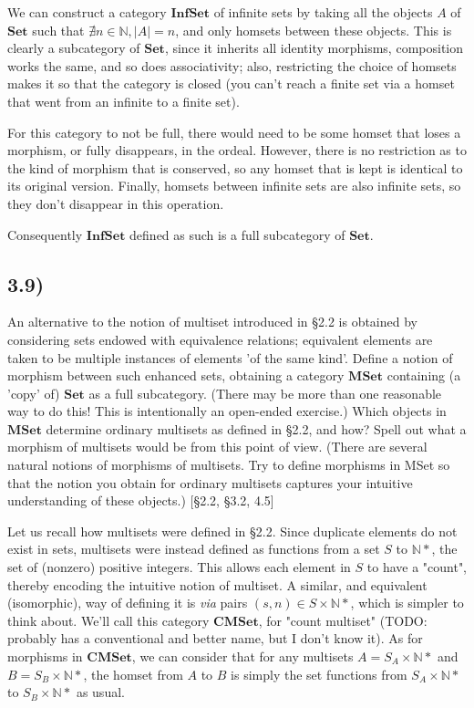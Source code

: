 \documentclass[12pt, letterpaper, twoside]{report}
\begin{document}
We can construct a category $\mathbf{InfSet}$ of infinite sets by taking all the objects $A$ of $\mathbf{Set}$ such that $\nexists n \in \mathbb{N}, |A| = n$, and only homsets between these objects. This is clearly a subcategory of $\mathbf{Set}$, since it inherits all identity morphisms, composition works the same, and so does associativity; also, restricting the choice of homsets makes it so that the category is closed (you can't reach a finite set via a homset that went from an infinite to a finite set).

For this category to not be full, there would need to be some homset that loses a morphism, or fully disappears, in the ordeal. However, there is no restriction as to the kind of morphism that is conserved, so any homset that is kept is identical to its original version. Finally, homsets between infinite sets are also infinite sets, so they don't disappear in this operation.

Consequently $\mathbf{InfSet}$ defined as such is a full subcategory of $\mathbf{Set}$.


\subsection*{3.9)}

An alternative to the notion of multiset introduced in §2.2 is obtained by considering sets endowed with equivalence relations; equivalent elements are taken to be multiple instances of elements 'of the same kind'. Define a notion of morphism between such enhanced sets, obtaining a category $\mathbf{MSet}$ containing (a 'copy' of) $\mathbf{Set}$ as a full subcategory. (There may be more than one reasonable way to do this! This is intentionally an open-ended exercise.) Which objects in $\mathbf{MSet}$ determine ordinary multisets as defined in §2.2, and how? Spell out what a morphism of multisets would be from this point of view. (There are several natural notions of morphisms of multisets. Try to define morphisms in MSet so that the notion you obtain for ordinary multisets captures your intuitive understanding of these objects.) [§2.2, §3.2, 4.5]

Let us recall how multisets were defined in §2.2. Since duplicate elements do not exist in sets, multisets were instead defined as functions from a set $S$ to $\mathbb{N}*$, the set of (nonzero) positive integers. This allows each element in $S$ to have a "count", thereby encoding the intuitive notion of multiset. A similar, and equivalent (isomorphic), way of defining it is \textit{via} pairs $(s, n) \in S \times \mathbb{N}*$, which is simpler to think about. We'll call this category $\mathbf{CMSet}$, for "count multiset" (TODO: probably has a conventional and better name, but I don't know it). As for morphisms in $\mathbf{CMSet}$, we can consider that for any multisets $A = S_A \times \mathbb{N}*$ and $B = S_B \times \mathbb{N}*$, the homset from $A$ to $B$ is simply the set functions from $S_A \times \mathbb{N}*$ to $S_B \times \mathbb{N}*$ as usual.
\end{document}
